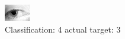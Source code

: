 \begin{figure}[h!]
\begin{center}
\includegraphics[width=0.60\columnwidth]{figures/ID1369_class_4_target_3.png}
\end{center}
\caption{ Classification: 4 actual target: 3}
\label{fig:ID1369_class_4_target_3}
\end{figure}
